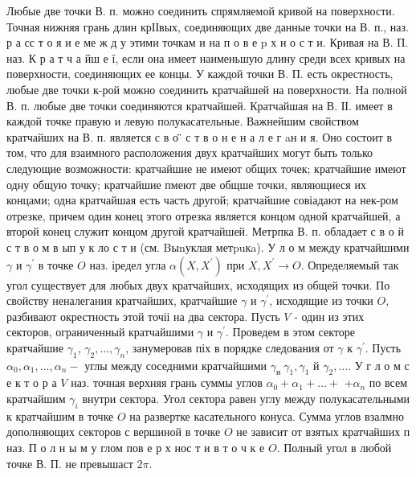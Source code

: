 \documentclass[10pt]{article}
\begin{document}
Любые две точки В. п. можно соединить спрямляемой кривой на поверхности. Точная нижняя грань длин крІІвых, соединяющих две данные точки на В. п., наз. р а сс т о я и е ме ж д у этими точкам и на п о в е p х н о с т и. Кривая на В. П. наз. К р а т ч а йш е ї, если она имеет наименьшую длину среди всех кривых на поверхности, соединяющих ее концы. У каждой точки В. П. есть окрестность, любые две точки к-рой можно соединить кратчайшей на поверхности. На полной В. п. любые две точки соединяются кратчайшей. Кратчайшая на В. ІІ. имеет в каждой точке правую и левую полукасательные. Важнейшим свойством кратчайших на В. п. является с в о ̈̈ с т в о н е н а л е г aн и я. Оно состоит в том, что для взаимного расположения двух кратчайших могут быть только следующие возможности: кратчайшие не имеют общих точек; кратчайшие имеют одну общую точку; кратчайшие пмеют две общше точки, являющиеся их концами; одна кратчайшая есть часть другой; кратчайшие совіадают на нек-ром отрезке, причем один конец этого отрезка является концом одной кратчайшей, а второй конец служит концом другой кратчайшей. Метрпка В. п. обладает с в о й с т в о м в ып у к ло с т и (см. Bыnуклая метpuкa). У $\mathbf{л}$ о м между кратчайшими $\gamma$ и $\gamma^{\prime}$ в точке $O$ наз. іредел угла $\alpha\left(X, X^{\prime}\right)$ при $X, X^{\prime} \rightarrow O$. Определяемый так угол существует для любых двух кратчайших, исходящих из общей точки. По свойству неналегания кратчайших, кратчайшие $\gamma$ и $\gamma^{\prime}$, исходящие из точки $O$, разбивают окрестность этой точіі на два сектора. Пусть $V$ - один из этих секторов, ограниченный кратчайшими $\gamma$ и $\gamma^{\prime}$. Проведем в этом секторе кратчайшие $\gamma_{1}$, $\gamma_{2}, \ldots, \gamma_{n}$, занумеровав піх в порядке следования от $\gamma$ к $\gamma^{\prime}$. Пусть $\alpha_{0}, \alpha_{1}, \ldots, \alpha_{n}-$ углы между соседними кратчайшими $\gamma_{\text {и }} \gamma_{1}, \gamma_{1}$ й $\gamma_{2}, \ldots$. У г л о м с е к т о р а $V$ наз. точная верхняя грань суммы углов $\alpha_{0}+\alpha_{1}+\ldots+$ $+\alpha_{n}$ по всем кратчайшим $\gamma_{i}$ внутри сектора. Угол сектора равен углу между полукасательными к кратчайшим в точке $O$ на развертке касательного конуса. Сумма углов взалмно дополняющих секторов с вершиной в точке $O$ не зависит от взятых кратчайших п наз. П о л н ы м у глом пов е р х нос т и в т о ч к е $O$. Полный угол в любой точке В. П. не превышаст $2 \pi$.
\end{document}
